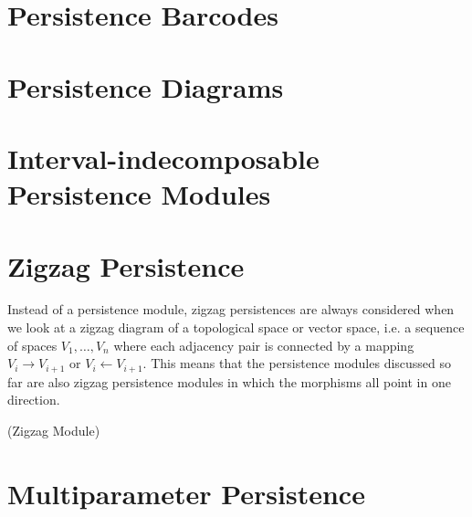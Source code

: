 \section{Persistence Barcodes}
\label{persistencebarcodes}

\section{Persistence Diagrams}
\label{persistencediagrams}

\section{Interval-indecomposable Persistence Modules}
\label{intervaldecomposition}

\section{Zigzag Persistence}
Instead of a persistence module, zigzag persistences are always considered when we look at a zigzag diagram of a topological space or vector space, i.e. a sequence of spaces $V_1, \ldots, V_n$ where each adjacency pair is connected by a mapping $V_i \rightarrow V_{i+1}$ or $V_i \leftarrow V_{i+1}$. This means that the persistence modules discussed so far are also zigzag persistence modules in which the morphisms all point in one direction.

\begin{definition}{(Zigzag Module) \cite[§2.1]{}}

\end{definition}


\section{Multiparameter Persistence}
